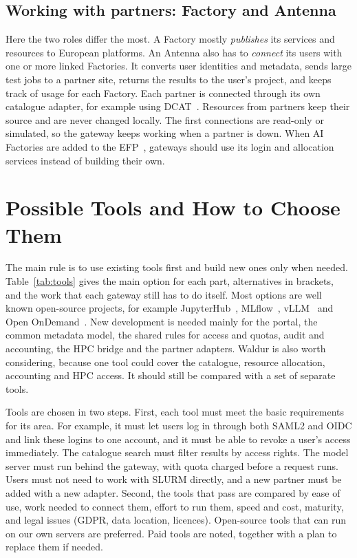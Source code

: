 \documentclass[conference,a4paper]{IEEEtran}
\begin{document}
\subsection{Working with partners: Factory and Antenna}
Here the two roles differ the most. A Factory mostly \emph{publishes} its services and resources to European platforms. An Antenna also has to \emph{connect} its users with one or more linked Factories. It converts user identities and metadata, sends large test jobs to a partner site, returns the results to the user's project, and keeps track of usage for each Factory. Each partner is connected through its own catalogue adapter, for example using DCAT~\cite{w3c_dcat3}. Resources from partners keep their source and are never changed locally. The first connections are read-only or simulated, so the gateway keeps working when a partner is down. When AI Factories are added to the EFP~\cite{eurohpc_efp}, gateways should use its login and allocation services instead of building their own.

\section{Possible Tools and How to Choose Them}

The main rule is to use existing tools first and build new ones only when needed. Table~\ref{tab:tools} gives the main option for each part, alternatives in brackets, and the work that each gateway still has to do itself. Most options are well known open-source projects, for example JupyterHub~\cite{kluyver2016jupyter}, MLflow~\cite{zaharia2018mlflow}, vLLM~\cite{kwon2023vllm} and Open OnDemand~\cite{hudak2018ood}. New development is needed mainly for the portal, the common metadata model, the shared rules for access and quotas, audit and accounting, the HPC bridge and the partner adapters. Waldur is also worth considering, because one tool could cover the catalogue, resource allocation, accounting and HPC access. It should still be compared with a set of separate tools.

Tools are chosen in two steps. First, each tool must meet the basic requirements for its area. For example, it must let users log in through both SAML2 and OIDC and link these logins to one account, and it must be able to revoke a user's access immediately. The catalogue search must filter results by access rights. The model server must run behind the gateway, with quota charged before a request runs. Users must not need to work with SLURM directly, and a new partner must be added with a new adapter. Second, the tools that pass are compared by ease of use, work needed to connect them, effort to run them, speed and cost, maturity, and legal issues (GDPR, data location, licences). Open-source tools that can run on our own servers are preferred. Paid tools are noted, together with a plan to replace them if needed.
\end{document}
